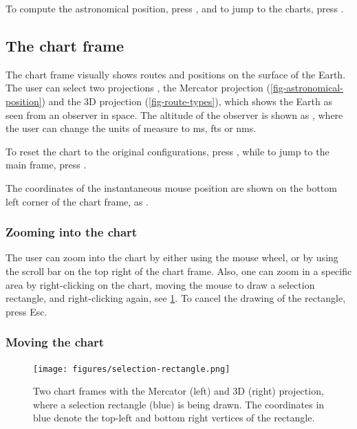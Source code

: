 \documentclass{ol-softwaremanual}
\begin{document}
To compute the astronomical position, press , and to jump to the charts, press .  

\subsection{The chart frame}\label{section-chart-frame}

The chart frame visually shows  routes and positions on the surface of the Earth. 
The user can select two projections \cite{bowditch2002the}, the Mercator projection (\cref{fig-astronomical-position}) and the 3D projection (\cref{fig-route-types}), which shows the Earth as seen from an observer in space. The altitude of the observer is shown as , where the user can change the units of measure to \acp{m}, \acp{ft} or \acp{nm}. 

To reset the chart to the original configurations, press , while to jump to the main frame, press . 

The coordinates of the instantaneous mouse position are shown on the bottom left corner of the chart frame, as . 


\subsubsection{Zooming into the chart} The user can zoom into the chart by either using the mouse wheel, or by using the scroll bar on the top right of the chart frame. Also, one can zoom in a specific area by right-clicking on the chart, moving the mouse to draw a selection rectangle, and right-clicking again, see \cref{fig-selection-rectangle}. To cancel the drawing of the rectangle, press Esc. 

\subsubsection{Moving the chart}



\begin{figure}
  \centering
  \texttt{[image: figures/selection-rectangle.png]}
  \caption{
    \label{fig-selection-rectangle}
    Two chart frames with the Mercator (left) and 3D (right) projection, where a selection rectangle (blue) is being drawn. The coordinates in blue denote the top-left and bottom right vertices of the rectangle. 
  }
\end{figure}
\end{document}

